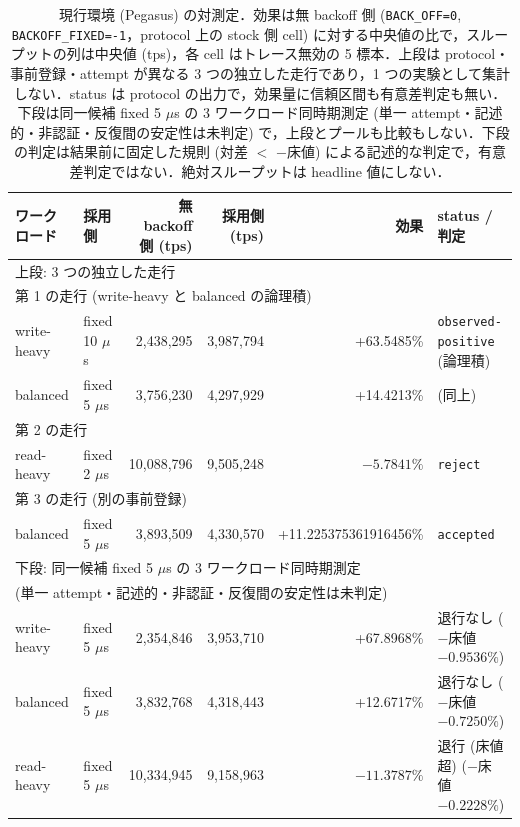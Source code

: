 \documentclass[submit,techrep,noauthor]{ipsj}
\begin{document}
\begin{table}[tb]
\caption{現行環境 (Pegasus) の対測定．効果は無 backoff 側 (\texttt{BACK\_OFF=0}, \texttt{BACKOFF\_FIXED=-1}，protocol 上の stock 側 cell) に対する中央値の比で，スループットの列は中央値 (tps)，各 cell はトレース無効の 5 標本．上段は protocol・事前登録・attempt が異なる 3 つの独立した走行であり，1 つの実験として集計しない．status は protocol の出力で，効果量に信頼区間も有意差判定も無い．下段は同一候補 fixed 5 $\mu$s の 3 ワークロード同時期測定 (単一 attempt・記述的・非認証・反復間の安定性は未判定) で，上段とプールも比較もしない．下段の判定は結果前に固定した規則 (対差 $<$ $-$床値) による記述的な判定で，有意差判定ではない．絶対スループットは headline 値にしない．}
\label{tab:current}
\centering
\footnotesize
\begin{tabular}{llrrrl}
\hline
ワークロード & 採用側 & 無 backoff 側 (tps) & 採用側 (tps) & 効果 & status / 判定 \\
\hline
\multicolumn{6}{l}{上段: 3 つの独立した走行} \\
\multicolumn{6}{l}{\quad 第 1 の走行 (write-heavy と balanced の論理積)} \\
write-heavy & fixed 10 $\mu$s & 2,438,295 & 3,987,794 & +63.5485\% & \texttt{observed-positive} (論理積) \\
balanced & fixed 5 $\mu$s & 3,756,230 & 4,297,929 & +14.4213\% & (同上) \\
\multicolumn{6}{l}{\quad 第 2 の走行} \\
read-heavy & fixed 2 $\mu$s & 10,088,796 & 9,505,248 & $-5.7841\%$ & \texttt{reject} \\
\multicolumn{6}{l}{\quad 第 3 の走行 (別の事前登録)} \\
balanced & fixed 5 $\mu$s & 3,893,509 & 4,330,570 & +11.225375361916456\% & \texttt{accepted} \\
\hline
\multicolumn{6}{l}{下段: 同一候補 fixed 5 $\mu$s の 3 ワークロード同時期測定} \\
\multicolumn{6}{l}{\quad (単一 attempt・記述的・非認証・反復間の安定性は未判定)} \\
write-heavy & fixed 5 $\mu$s & 2,354,846 & 3,953,710 & +67.8968\% & 退行なし ($-$床値 $-0.9536\%$) \\
balanced & fixed 5 $\mu$s & 3,832,768 & 4,318,443 & +12.6717\% & 退行なし ($-$床値 $-0.7250\%$) \\
read-heavy & fixed 5 $\mu$s & 10,334,945 & 9,158,963 & $-11.3787\%$ & 退行 (床値超) ($-$床値 $-0.2228\%$) \\
\hline
\end{tabular}
\end{table}
\end{document}
